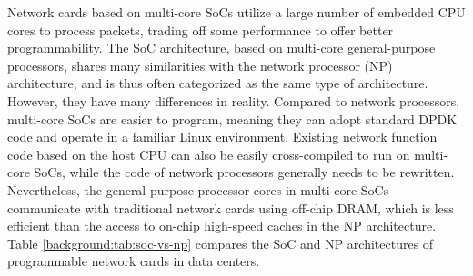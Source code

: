 Network cards based on multi-core SoCs utilize a large number of embedded CPU cores to process packets, trading off some performance to offer better programmability. The SoC architecture, based on multi-core general-purpose processors, shares many similarities with the network processor (NP) architecture, and is thus often categorized as the same type of architecture. However, they have many differences in reality. Compared to network processors, multi-core SoCs are easier to program, meaning they can adopt standard DPDK code and operate in a familiar Linux environment. Existing network function code based on the host CPU can also be easily cross-compiled to run on multi-core SoCs, while the code of network processors generally needs to be rewritten. Nevertheless, the general-purpose processor cores in multi-core SoCs communicate with traditional network cards using off-chip DRAM, which is less efficient than the access to on-chip high-speed caches in the NP architecture. Table \ref{background:tab:soc-vs-np} compares the SoC and NP architectures of programmable network cards in data centers.

